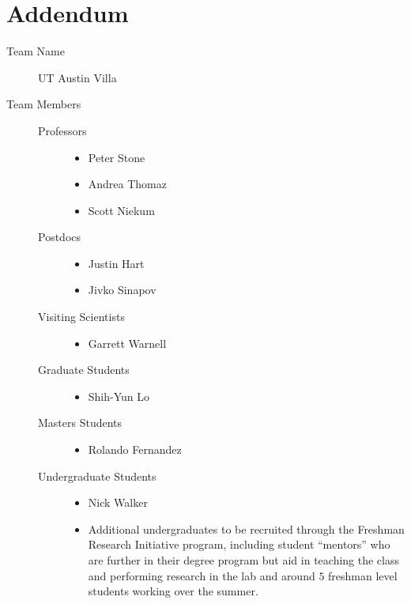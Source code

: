 \section*{Addendum}
\begin{description}
\item[Team Name] UT Austin Villa
\item[Team Members]\hfill
\begin{description}
\item[Professors]\hfill
\begin{itemize}
\item Peter Stone
\item Andrea Thomaz
\item Scott Niekum
\end{itemize}
\item[Postdocs]\hfill
\begin{itemize}
\item Justin Hart
\item Jivko Sinapov
\end{itemize}
\item[Visiting Scientists]\hfill
\begin{itemize}
\item Garrett Warnell
\end{itemize}
\item[Graduate Students]\hfill
\begin{itemize}
\item Shih-Yun Lo
\end{itemize}

\item[Masters Students]\hfill
\begin{itemize}
\item Rolando Fernandez
\end{itemize}

\item[Undergraduate Students]\hfill
\begin{itemize}
\item Nick Walker
\item Additional undergraduates to be recruited through the Freshman Research Initiative program, including student ``mentors'' who are further in their degree program but aid in teaching the class and performing research in the lab and around $5$ freshman level students working over the summer.
\end{itemize}


\end{description}
\end{description}
